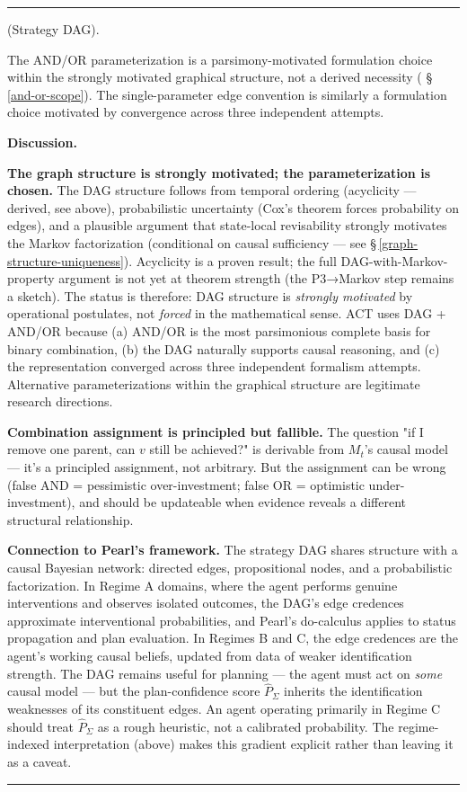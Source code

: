 \documentclass[11pt,oneside]{article}
\newcounter{claim}[section]
\renewcommand{\theclaim}{\thesection.\arabic{claim}}
\newenvironment{segment}[2]{%
  \refstepcounter{claim}%
  \bigskip\noindent\hrule\smallskip
  \noindent{\bfseries #1~\theclaim}\enskip(#2).\par\smallskip
  \noindent\ignorespaces
}{%
  \par\smallskip\noindent\hrule\bigskip
}
\newenvironment{definition}[1][]{\begin{segment}{Definition}{#1}}{\end{segment}}
\begin{document}
\begin{definition}[Strategy DAG]
The AND/OR parameterization is a parsimony-motivated formulation choice within the strongly motivated graphical structure, not a derived necessity ( \S\,\ref{and-or-scope}). The single-parameter edge convention is similarly a formulation choice motivated by convergence across three independent attempts.


\medskip\noindent\textbf{Discussion.}


\textbf{The graph structure is strongly motivated; the parameterization is chosen.} The DAG structure follows from temporal ordering (acyclicity — derived, see above), probabilistic uncertainty (Cox's theorem forces probability on edges), and a plausible argument that state-local revisability strongly motivates the Markov factorization (conditional on causal sufficiency — see \S\,\ref{graph-structure-uniqueness}). Acyclicity is a proven result; the full DAG-with-Markov-property argument is not yet at theorem strength (the P3→Markov step remains a sketch). The status is therefore: DAG structure is \textit{strongly motivated} by operational postulates, not \textit{forced} in the mathematical sense. ACT uses DAG + AND/OR because (a) AND/OR is the most parsimonious complete basis for binary combination, (b) the DAG naturally supports causal reasoning, and (c) the representation converged across three independent formalism attempts. Alternative parameterizations within the graphical structure are legitimate research directions.

\textbf{Combination assignment is principled but fallible.} The question "if I remove one parent, can $v$ still be achieved?" is derivable from $M_t$'s causal model — it's a principled assignment, not arbitrary. But the assignment can be wrong (false AND = pessimistic over-investment; false OR = optimistic under-investment), and should be updateable when evidence reveals a different structural relationship.

\textbf{Connection to Pearl's framework.} The strategy DAG shares structure with a causal Bayesian network: directed edges, propositional nodes, and a probabilistic factorization. In Regime A domains, where the agent performs genuine interventions and observes isolated outcomes, the DAG's edge credences approximate interventional probabilities, and Pearl's do-calculus applies to status propagation and plan evaluation. In Regimes B and C, the edge credences are the agent's working causal beliefs, updated from data of weaker identification strength. The DAG remains useful for planning --- the agent must act on \textit{some} causal model --- but the plan-confidence score $\hat P_\Sigma$ inherits the identification weaknesses of its constituent edges. An agent operating primarily in Regime C should treat $\hat P_\Sigma$ as a rough heuristic, not a calibrated probability. The regime-indexed interpretation (above) makes this gradient explicit rather than leaving it as a caveat.


\end{definition}
\end{document}
